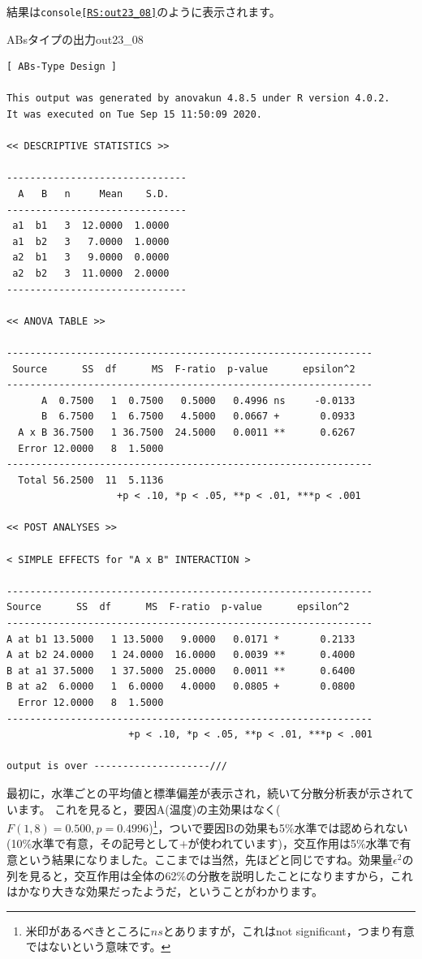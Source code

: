 \documentclass{ltjsarticle}
\begin{document}
結果は\texttt{console\ref{RS:out23_08}}のように表示されます。
\begin{Rscreen}{ABsタイプの出力}{out23_08}
\begin{verbatim}
[ ABs-Type Design ]

This output was generated by anovakun 4.8.5 under R version 4.0.2.
It was executed on Tue Sep 15 11:50:09 2020.

<< DESCRIPTIVE STATISTICS >>

-------------------------------
  A   B   n     Mean    S.D. 
-------------------------------
 a1  b1   3  12.0000  1.0000 
 a1  b2   3   7.0000  1.0000 
 a2  b1   3   9.0000  0.0000 
 a2  b2   3  11.0000  2.0000 
-------------------------------

<< ANOVA TABLE >>

---------------------------------------------------------------
 Source      SS  df      MS  F-ratio  p-value      epsilon^2 
---------------------------------------------------------------
      A  0.7500   1  0.7500   0.5000   0.4996 ns     -0.0133 
      B  6.7500   1  6.7500   4.5000   0.0667 +       0.0933 
  A x B 36.7500   1 36.7500  24.5000   0.0011 **      0.6267 
  Error 12.0000   8  1.5000                                  
---------------------------------------------------------------
  Total 56.2500  11  5.1136                                  
                   +p < .10, *p < .05, **p < .01, ***p < .001

<< POST ANALYSES >>

< SIMPLE EFFECTS for "A x B" INTERACTION >

---------------------------------------------------------------
Source      SS  df      MS  F-ratio  p-value      epsilon^2 
---------------------------------------------------------------
A at b1 13.5000   1 13.5000   9.0000   0.0171 *       0.2133 
A at b2 24.0000   1 24.0000  16.0000   0.0039 **      0.4000 
B at a1 37.5000   1 37.5000  25.0000   0.0011 **      0.6400 
B at a2  6.0000   1  6.0000   4.0000   0.0805 +       0.0800 
  Error 12.0000   8  1.5000                                  
---------------------------------------------------------------
                     +p < .10, *p < .05, **p < .01, ***p < .001

output is over --------------------///
\end{verbatim}
\end{Rscreen}

最初に，水準ごとの平均値と標準偏差が表示され，続いて分散分析表が示されています。
これを見ると，要因A(温度)の主効果はなく($F(1,8)=0.500,p=0.4996$)\footnote{米印があるべきところに$ns$とありますが，これはnot significant，つまり有意ではないという意味です。}，ついで要因Bの効果も5\%水準では認められない(10\%水準で有意，その記号として$+$が使われています)，交互作用は5\%水準で有意という結果になりました。ここまでは当然，先ほどと同じですね。効果量$\epsilon^2$の列を見ると，交互作用は全体の62\%の分散を説明したことになりますから，これはかなり大きな効果だったようだ，ということがわかります。
\end{document}
